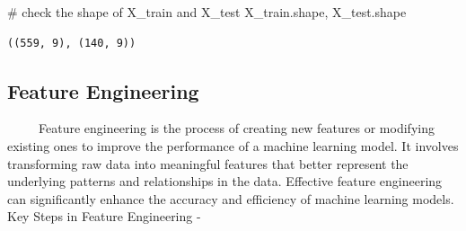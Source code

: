 \documentclass[
  letterpaper,
  DIV=11,
  numbers=noendperiod]{scrreprt}
\newenvironment{Shaded}{\begin{snugshade}}{\end{snugshade}}
\newcommand{\CommentTok}[1]{\textcolor[rgb]{0.37,0.37,0.37}{#1}}
\newcommand{\NormalTok}[1]{\textcolor[rgb]{0.00,0.23,0.31}{#1}}
\begin{document}
\begin{Shaded}
\begin{Highlighting}[]
\CommentTok{\# check the shape of X\_train and X\_test}
\NormalTok{X\_train.shape, X\_test.shape}
\end{Highlighting}
\end{Shaded}

\begin{verbatim}
((559, 9), (140, 9))
\end{verbatim}

\subsection{Feature Engineering}\label{feature-engineering}

~~~~~Feature engineering is the process of creating new features or
modifying existing ones to improve the performance of a machine learning
model. It involves transforming raw data into meaningful features that
better represent the underlying patterns and relationships in the data.
Effective feature engineering can significantly enhance the accuracy and
efficiency of machine learning models. Key Steps in Feature Engineering
-
\end{document}
